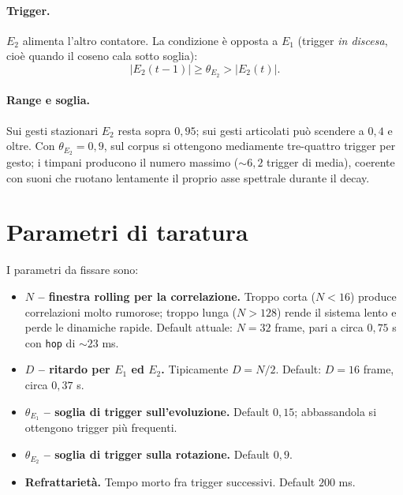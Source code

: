 \documentclass[a4paper,11pt]{article}
\begin{document}
\paragraph{Trigger.}
$E_2$ alimenta l'altro contatore. La condizione è opposta a $E_1$
(trigger \emph{in discesa}, cioè quando il coseno cala sotto soglia):
\[
\lvert E_2(t-1) \rvert \ge \theta_{E_2} > \lvert E_2(t) \rvert.
\]

\paragraph{Range e soglia.}
Sui gesti stazionari $E_2$ resta sopra $0{,}95$; sui gesti articolati può
scendere a $0{,}4$ e oltre. Con $\theta_{E_2} = 0{,}9$, sul corpus si
ottengono mediamente tre-quattro trigger per gesto; i timpani
producono il numero massimo ($\sim 6{,}2$ trigger di media), coerente
con suoni che ruotano lentamente il proprio asse spettrale durante il
decay.

\section{Parametri di taratura}

I parametri da fissare sono:

\begin{itemize}[nosep]
  \item \textbf{$N$ -- finestra rolling per la correlazione.} Troppo
        corta ($N < 16$) produce correlazioni molto rumorose; troppo
        lunga ($N > 128$) rende il sistema lento e perde le dinamiche
        rapide. Default attuale: $N = 32$ frame, pari a circa
        $0{,}75$ s con \texttt{hop} di $\sim 23$ ms.
  \item \textbf{$D$ -- ritardo per $E_1$ ed $E_2$.} Tipicamente $D = N/2$.
        Default: $D = 16$ frame, circa $0{,}37$ s.
  \item \textbf{$\theta_{E_1}$ -- soglia di trigger sull'evoluzione.}
        Default $0{,}15$; abbassandola si ottengono trigger più frequenti.
  \item \textbf{$\theta_{E_2}$ -- soglia di trigger sulla rotazione.}
        Default $0{,}9$.
  \item \textbf{Refrattarietà.} Tempo morto fra trigger successivi.
        Default $200$ ms.
\end{itemize}

\end{document}
